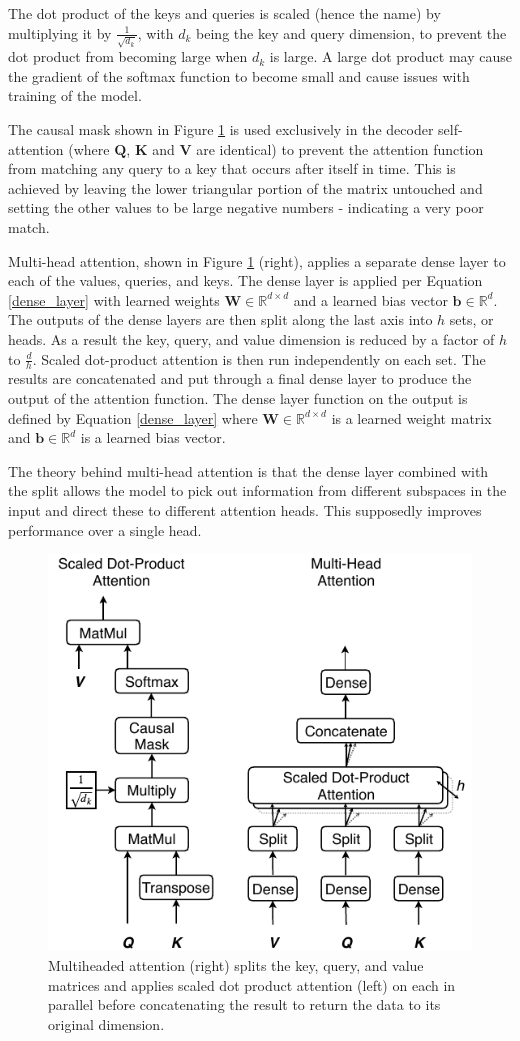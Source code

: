 \documentclass[conference]{IEEEtran}
\begin{document}
The dot product of the keys and queries is scaled (hence the name) by multiplying it by $\frac{1}{\sqrt{d_k}}$, with $d_k$ being the key and query dimension, to prevent the dot product from becoming large when $d_k$ is large.
A large dot product may cause the gradient of the softmax function to become small and cause issues with training of the model.

The causal mask shown in Figure \ref{fig:multihead} is used exclusively in the decoder self-attention (where $\boldsymbol{Q}$, $\boldsymbol{K}$ and $\boldsymbol{V}$ are identical) to prevent the attention function from matching any query to a key that occurs after itself in time.
This is achieved by leaving the lower triangular portion of the matrix untouched and setting the other values to be large negative numbers - indicating a very poor match.

Multi-head attention, shown in Figure \ref{fig:multihead} (right), applies a separate dense layer to each of the values, queries, and keys. 
The dense layer is applied per Equation \ref{dense_layer} with learned weights $\boldsymbol{W} \in \mathbb{R}^{d \times d}$ and a learned bias vector $\boldsymbol{b} \in \mathbb{R}^{d}$.
The outputs of the dense layers are then split along the last axis into $h$ sets, or heads.
As a result the key, query, and value dimension is reduced by a factor of $h$ to $\frac{d}{h}$.
Scaled dot-product attention is then run independently on each set.
The results are concatenated and put through a final dense layer to produce the output of the attention function.
The dense layer function on the output is defined by Equation \ref{dense_layer} where $\boldsymbol{W} \in \mathbb{R}^{d \times d}$ is a learned weight matrix and $\boldsymbol{b} \in \mathbb{R}^{d}$ is a learned bias vector.

The theory behind multi-head attention is that the dense layer combined with the split allows the model to pick out information from different subspaces in the input and direct these to different attention heads.
This supposedly improves performance over a single head.

\begin{figure}[htbp]
	\centerline{\includegraphics[width=.35\textwidth]{images/multihead_attn.pdf}}
	\caption{Multiheaded attention (right) splits the key, query, and value matrices and applies scaled dot product attention (left) on each in parallel before concatenating the result to return the data to its original dimension.}
	\label{fig:multihead}
\end{figure}
\end{document}
